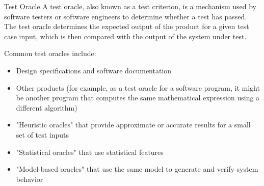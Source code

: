 \documentclass{beamer}
\begin{document}
% 

\begin{frame}[t]{Test Oracle}
A test oracle, also known as a test criterion, is a mechanism used by software testers or software engineers to determine whether a test has passed. The test oracle determines the expected output of the product for a given test case input, which is then compared with the output of the system under test.

Common test oracles include:

\begin{itemize}
    \item Design specifications and software documentation
    \item Other products (for example, as a test oracle for a software program, it might be another program that computes the same mathematical expression using a different algorithm)
    \item "Heuristic oracles" that provide approximate or accurate results for a small set of test inputs
    \item "Statistical oracles" that use statistical features
    \item "Model-based oracles" that use the same model to generate and verify system behavior
\end{itemize}
\end{frame}
\end{document}
